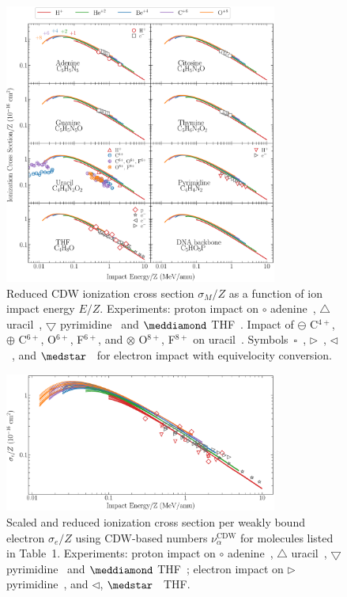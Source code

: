 \documentclass[10pt,showpacs,twocolumn]{revtex4}
\begin{document}
\newpage
\begin{figure}[]
\centering
\includegraphics[width=0.8\textwidth]{figuras/zscale.eps}
\caption{Reduced CDW ionization cross section $\sigma_{M}/Z$ as a function 
of ion impact energy $E/Z$. 
Experiments: 
proton impact on 
\mbox{\Large$\circ$} adenine~\cite{iriki2011},
$\triangle$ uracil~\cite{itoh2013}, 
$\bigtriangledown$ pyrimidine~\cite{wolff2014} and 
$\meddiamond$ THF~\cite{wang2016}.
Impact of $\ominus$ C$^{4+}$, 
$\oplus$ C$^{6+}$, O$^{6+}$, F$^{6+}$, and
$\otimes$ O$^{8+}$, F$^{8+}$ on 
uracil~\cite{agnihotri2012,agnihotri2013}. 
Symbols~$\square$~\cite{rahman2016}, $\rhd$~\cite{bug2017}, 
$\lhd$~\cite{wolf2019}, and $\medstar$~\cite{fuss2009} for electron 
impact with equivelocity conversion.}
\label{fig:zreduced}
\end{figure} 

\begin{figure}[]
\centering
\includegraphics[width=0.8\textwidth]{figuras/zmol85.eps}
\caption{Scaled and reduced ionization cross section per weakly bound 
electron $\sigma_e/Z$ using CDW-based numbers $\nu_{\alpha}^{\text{CDW}}$ 
for molecules listed in Table~1.
Experiments: proton impact on 
\mbox{\Large$\circ$} adenine~\cite{iriki2011}, 
$\triangle$ uracil~\cite{itoh2013}, 
$\bigtriangledown$ pyrimidine~\cite{wolff2014} and $\meddiamond$ 
THF~\cite{wang2016}; electron impact on $\rhd$ pyrimidine~\cite{bug2017},
and $\lhd$, $\medstar$~\cite{wolf2019,fuss2009} THF.}
\label{fig:zredscaled}
\end{figure}
\end{document}
